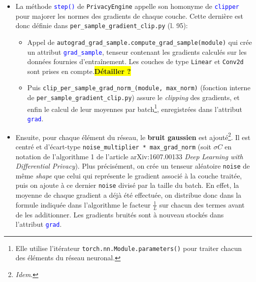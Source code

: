 \documentclass[a4paper,11pt]{article} %
\newcommand{\ttt}[1]{\texttt{#1}}
\newcommand{\file}[1]{\colorbox{blue!10}{\texttt{#1}}}
\newcommand{\code}[1]{\textcolor{blue}{\texttt{#1}}}
\newcommand{\rem}[1]{\colorbox{yellow}{\textbf{#1}}}
\begin{document}
\begin{itemize}
    \item
    La méthode \code{step()} de \ttt{PrivacyEngine} appelle son homonyme de \code{clipper} pour majorer les normes des gradients de chaque couche. Cette dernière est donc définie dans \file{per\_sample\_gradient\_clip.py} (l. 95):
    \begin{itemize}
        \item
        Appel de \ttt{autograd\_grad\_sample.compute\_grad\_sample(module)} qui crée un attribut \code{grad\_sample}, tenseur contenant les gradients calculés sur les données fournies d'entraînement. Les couches de type \ttt{Linear} et \ttt{Conv2d} sont prises en compte.\rem{Détailler  ?}
        \item
        Puis \ttt{clip\_per\_sample\_grad\_norm\_(module, max\_norm)} (fonction interne de \file{per\_sample\_gradient\_clip.py}) assure le \emph{clipping} des gradients, et enfin le calcul de leur moyennes  par batch\footnote{Elle utilise l'itérateur \ttt{torch.nn.Module.parameters()} pour traiter chacun des éléments du réseau neuronal.}, enregistrées dans l'attribut \code{grad}.
    \end{itemize}
    \item
    Ensuite, pour chaque élément du réseau, le \textbf{bruit gaussien} est ajouté\footnote{\emph{Idem}.}. Il est centré et d'écart-type  \ttt{noise\_multiplier * max\_grad\_norm} (soit $\sigma C$ en notation de l'algorithme 1 de l'article arXiv:1607.00133 \emph{Deep Learning with Differential Privacy}). Plus précisément, on crée un tenseur aléatoire \ttt{noise} de même \emph{shape} que celui qui représente le gradient associé à la couche traitée, puis on ajoute à ce dernier \ttt{noise} divisé par la taille du batch. En effet, la moyenne de chaque gradient a déjà été effectuée, on distribue donc dans la formule indiquée dans l'algorithme le facteur $\frac{1}{L}$ sur chacun des termes avant de les additionner. Les gradients bruités sont à nouveau stockés dans l'attribut \code{grad}.

\end{itemize}
\end{document}
